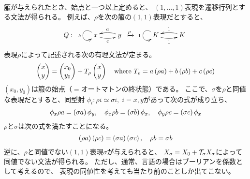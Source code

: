 {	\begin{note}[箙の表現と文法]\label{note:箙の表現と文法} %
		箙が与えられたとき、始点と一つ以上定めると、
		$(1,\dots,1)$表現を遷移行列とする文法が得られる。
		例えば、$\rho$を次の箙の$(1,1)$表現だとすると、
		\begin{equation*}\begin{split}
			Q:\;\xymatrix{
				x \ar@(lu,ld)_b \ar@/_1ex/[r]_c & y \ar@/_1ex/[l]_a
			} \xmapsto{\rho} \xymatrix{
				K \ar@(lu,ld)_1 \ar@/_1ex/[r]_1 & K \ar@/_1ex/[l]_1
			}
		\end{split}\end{equation*}
		表現$\rho$によって記述される次の有理文法が定まる。
		\begin{equation*}\begin{split}
			\begin{pmatrix}{x}\\{y}\end{pmatrix} = \begin{pmatrix}{x_0}\\{y_0}\end{pmatrix} + T_\rho\begin{pmatrix}{x}\\{y}\end{pmatrix} \quad\text{where }
			T_\rho = a\left({\rho a}\right) + b\left({\rho b}\right) + c\left({\rho c}\right)
		\end{split}\end{equation*}
		$(x_0,y_0)$は箙の始点（$=$オートマトンの終状態）である。
		ここで、$\sigma$を$\rho$と同値な表現だとすると、同型射
		$\phi_i:\rho i\simeq\sigma i,\; i=x,y$があって次の式が成り立ち、
		\begin{equation*}\begin{split}
			\phi_x\rho a = \left({\sigma a}\right)\phi_y
			,\quad \phi_x\rho b = \left({\sigma b}\right)\phi_x
			,\quad \phi_y\rho c = \left({\sigma c}\right)\phi_x
		\end{split}\end{equation*}
		$\rho$と$\sigma$は次の式を満たすことになる。
		\begin{equation*}\begin{split}
			\left({\rho a}\right)\left({\rho c}\right) = \left({\sigma a}\right)\left({\sigma c}\right)
			,\quad \rho b = \sigma b
		\end{split}\end{equation*}
		逆に、$\rho$と同値でない$(1,1)$表現$\sigma$が与えられると、
		$X_\sigma=X_0+{{\mathcal{T}}}_\sigma X_\sigma$によって同値でない文法が得られる。
		ただし、通常、言語の場合はブーリアンを係数として考えるので、
		表現の同値性を考えても当たり前のことしか出てこない。
	\end{note} %
	
}
